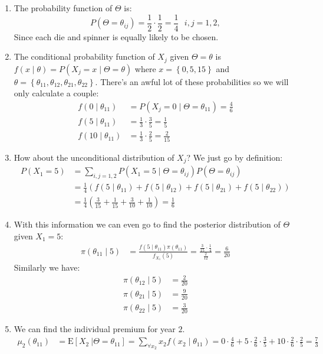 \documentclass[english,12pt]{article}
\theoremstyle{plain}
\theoremstyle{definition}
\theoremstyle{definition} %
\newcommand{\enum}[1]{\begin{enumerate} #1 \end{enumerate}}
\newcommand{\condex}[2]{\mbox{E} \left[ \left. #1 \ \right\vert \left. #2 \right. \right]}
\begin{document}
\enum{
\item The probability function of $\Theta$ is:
\[P(\Theta=\theta_{ij})=\frac{1}{2}\cdot\frac{1}{2}=\frac{1}{4}\text{ }i,j=1,2,\]
Since each die and spinner is equally likely to be chosen.

\item The conditional probability function of $X_j$ given $\Theta=\theta$ is $f(x\mid\theta)=P(X_j=x\mid\Theta=\theta)$ where $x=\left\{0,5,15\right\}$ and $\theta=\left\{\theta_{11},\theta_{12},\theta_{21},\theta_{22}\right\}$.  There's an awful lot of these probabilities so we will only calculate a couple:
\begin{align*}
f(0\mid\theta_{11})
&=P(X_j=0\mid\Theta=\theta_{11})
=\frac{4}{6}\\
f(5\mid\theta_{11})
&=\frac{1}{3}\cdot\frac{3}{5}
=\frac{1}{5}\\
f(10\mid\theta_{11})
&=\frac{1}{3}\cdot\frac{2}{5}
=\frac{2}{15}
\end{align*}

\item How about the unconditional distribution of $X_j$?  We just go by definition:
\begin{align*}
P(X_1=5)
&=\sum\limits_{i,j=1,2}P(X_1=5\mid\Theta=\theta_{ij})P(\Theta=\theta_{ij})\\
&=\frac{1}{4}(f(5\mid\theta_{11})+f(5\mid\theta_{12})+f(5\mid\theta_{21})+f(5\mid\theta_{22}))\\
&=\frac{1}{4}\left(\frac{3}{15}+\frac{1}{15}+\frac{3}{10}+\frac{1}{10}\right)
=\frac{1}{6}
\end{align*}

\item With this information we can even go to find the posterior distribution of $\Theta$ given $X_1=5$:
\begin{align*}
\pi(\theta_{11}\mid 5)
&=\frac{f(5\mid\theta_{11})\pi(\theta_{11})}{f_{X_1}(5)}
=\frac{\frac{3}{15}\cdot\frac{1}{4}}{\frac{2}{12}}
=\frac{6}{20}
\end{align*}
Similarly we have:
\begin{align*}
\pi(\theta_{12}\mid 5)&=\frac{2}{20}\\
\pi(\theta_{21}\mid 5)&=\frac{9}{20}\\
\pi(\theta_{22}\mid 5)&=\frac{3}{20}
\end{align*}

\item  We can find the individual premium for year $2$.
\begin{align*}
\mu_2(\theta_{11})&=\condex{X_2}{\Theta=\theta_{11}}
=\sum\limits_{\forall x_2}x_2f(x_2\mid\theta_{11})
=0\cdot\frac{4}{6}+5\cdot\frac{2}{6}\cdot\frac{3}{5}+10\cdot\frac{2}{6}\cdot\frac{2}{5}
=\frac{7}{3}
\end{align*}

}
\end{document}
